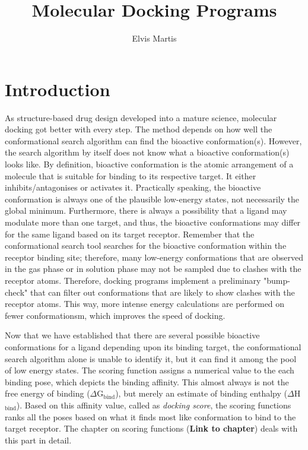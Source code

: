 \documentclass[12pt, a4paper]{article}
\title{Molecular Docking Programs}
\author{Elvis Martis}
\begin{document}
\maketitle
\section{Introduction}
As structure-based drug design developed into a mature science, molecular docking got better with every step. The method depends on how well the conformational search algorithm can find the bioactive conformation(s). However, the search algorithm by itself does not know what a bioactive conformation(s) looks like. By definition, bioactive conformation is the atomic arrangement of a molecule that is suitable for binding to its respective target. It either inhibits/antagonises or activates it. Practically speaking, the bioactive conformation is always one of the plausible low-energy states, not necessarily the global minimum. Furthermore, there is always a possibility that a ligand may modulate more than one target, and thus, the bioactive conformations may differ for the same ligand based on its target receptor. Remember that the conformational search tool searches for the bioactive conformation within the receptor binding site; therefore, many low-energy conformations that are observed in the gas phase or in solution phase may not be sampled due to clashes with the receptor atoms. Therefore, docking programs implement a preliminary "bump-check" that can filter out conformations that are likely to show clashes with the receptor atoms. This way, more intense energy calculations are performed on fewer conformationsm, which improves the speed of docking. 

Now that we have established that there are several possible bioactive conformations for a ligand depending upon its binding target, the conformational search algorithm alone is unable to identify it, but it can find it among the pool of low energy states. The scoring function assigns a numerical value to the each binding pose, which depicts the binding affinity. This almost always is not the free energy of binding ($\Delta$G$_{\text{bind}}$), but merely an estimate of binding enthalpy ($\Delta$H$_{\text{bind}}$). Based on this affinity value, called as \textit{docking score}, the scoring functions ranks all the poses based on what it finds most like conformation to bind to the target receptor. The chapter on scoring functions (\textbf{Link to chapter}) deals with this part in detail. 
\end{document}
